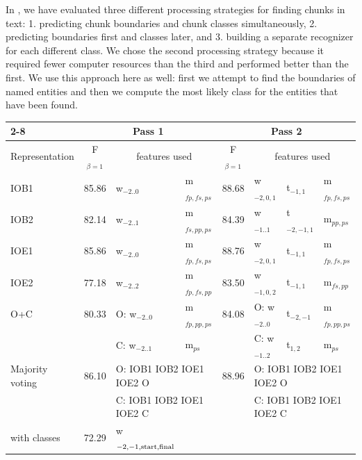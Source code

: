 \documentclass[11pt]{article}
\begin{document}
In \cite{tks2002jmlr}, we have evaluated three different processing
strategies for finding chunks in text: 1. predicting chunk boundaries
and chunk classes simultaneously, 2. predicting boundaries first and
classes later, and 3. building a separate recognizer for each
different class.
We chose the second processing strategy because it required fewer
computer resources than the third and performed better than the first.
We use this approach here as well: first we attempt to find
the boundaries of named entities and then we compute the most
likely class for the entities that have been found.

\begin{table}[t]
\begin{center}
\begin{tabular}{|l|c|ll|c|lll|}\cline{2-8}
\multicolumn{1}{l|}{Spanish train} & \multicolumn{3}{c|}{Pass 1}
                           & \multicolumn{4}{c|}{Pass 2} \\\hline
Representation& F$_{\beta=1}$ & \multicolumn{2}{c|}{features used} &
       F$_{\beta=1}$ & \multicolumn{3}{c|}{features used} \\\hline
IOB1 & 85.86 & w$_{-2..0}$                    & m$_{fp,fs,ps}$
     & 88.68 & w$_{-2,0,1}$   & t$_{-1,1}$    & m$_{fp,fs,ps}$ \\
IOB2 & 82.14 & w$_{-2..1}$                    & m$_{fs,pp,ps}$
     & 84.39 & w$_{-1..1}$    & t$_{-2,-1,1}$ & m$_{pp,ps}$    \\
IOE1 & 85.86 & w$_{-2..0}$                    & m$_{fp,fs,ps}$
     & 88.76 & w$_{-2,0,1}$   & t$_{-1,1}$    & m$_{fp,fs,ps}$ \\
IOE2 & 77.18 & w$_{-2..2}$                    & m$_{fp,fs,pp}$
     & 83.50 & w$_{-1,0,2}$   & t$_{-1,1}$    & m$_{fs,pp}$    \\
O+C  & 80.33 & O: w$_{-2..0}$                 & m$_{fp,pp,ps}$
     & 84.08 & O: w$_{-2..0}$ & t$_{-2,-1}$   & m$_{fp,pp,ps}$ \\
     &       & C: w$_{-2..1}$                 & m$_{ps}$
     &       & C: w$_{-1..2}$ & t$_{1,2}$     & m$_{ps}$       \\\hline
Majority voting & 86.10 & \multicolumn{2}{l|}{O: IOB1 IOB2 IOE1 IOE2 O}
                & 88.96 & \multicolumn{3}{l|}{O: IOB1 IOB2 IOE1 IOE2 O} \\
                &       & \multicolumn{2}{l|}{C: IOB1 IOB2 IOE1 IOE2 C}
                &       & \multicolumn{3}{l|}{C: IOB1 IOB2 IOE1 IOE2 C}\\\hline
with classes    & 72.29 & w$_{{\rm -2,-1,start,final}}$ &

\end{tabular}
\end{center}
\end{table}
\end{document}
